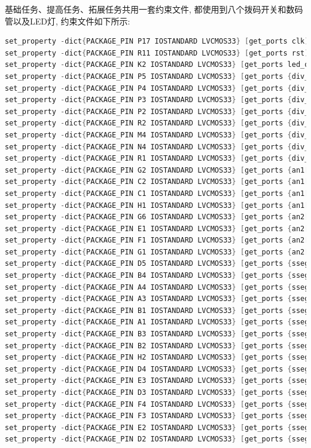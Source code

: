 \documentclass{article}
\begin{document}
基础任务、提高任务、拓展任务共用一套约束文件, 都使用到八个拨码开关和数码管以及LED灯, 约束文件如下所示:
\begin{lstlisting}[language=Verilog, caption={基础任务、提高任务、拓展任务约束文件}]
set_property -dict{PACKAGE_PIN P17 IOSTANDARD LVCMOS33} [get_ports clk]
set_property -dict{PACKAGE_PIN R11 IOSTANDARD LVCMOS33} [get_ports rst]
set_property -dict{PACKAGE_PIN K2 IOSTANDARD LVCMOS33} [get_ports led_out]
set_property -dict{PACKAGE_PIN P5 IOSTANDARD LVCMOS33} [get_ports {div_coe[7]}]
set_property -dict{PACKAGE_PIN P4 IOSTANDARD LVCMOS33} [get_ports {div_coe[6]}]
set_property -dict{PACKAGE_PIN P3 IOSTANDARD LVCMOS33} [get_ports {div_coe[5]}]
set_property -dict{PACKAGE_PIN P2 IOSTANDARD LVCMOS33} [get_ports {div_coe[4]}]
set_property -dict{PACKAGE_PIN R2 IOSTANDARD LVCMOS33} [get_ports {div_coe[3]}]
set_property -dict{PACKAGE_PIN M4 IOSTANDARD LVCMOS33} [get_ports {div_coe[2]}]
set_property -dict{PACKAGE_PIN N4 IOSTANDARD LVCMOS33} [get_ports {div_coe[1]}]
set_property -dict{PACKAGE_PIN R1 IOSTANDARD LVCMOS33} [get_ports {div_coe[0]}]
set_property -dict{PACKAGE_PIN G2 IOSTANDARD LVCMOS33} [get_ports {an1[0]}]
set_property -dict{PACKAGE_PIN C2 IOSTANDARD LVCMOS33} [get_ports {an1[1]}]
set_property -dict{PACKAGE_PIN C1 IOSTANDARD LVCMOS33} [get_ports {an1[2]}]
set_property -dict{PACKAGE_PIN H1 IOSTANDARD LVCMOS33} [get_ports {an1[3]}]
set_property -dict{PACKAGE_PIN G6 IOSTANDARD LVCMOS33} [get_ports {an2[3]}]
set_property -dict{PACKAGE_PIN E1 IOSTANDARD LVCMOS33} [get_ports {an2[2]}]
set_property -dict{PACKAGE_PIN F1 IOSTANDARD LVCMOS33} [get_ports {an2[1]}]
set_property -dict{PACKAGE_PIN G1 IOSTANDARD LVCMOS33} [get_ports {an2[0]}]
set_property -dict{PACKAGE_PIN D5 IOSTANDARD LVCMOS33} [get_ports {sseg1[7]}]
set_property -dict{PACKAGE_PIN B4 IOSTANDARD LVCMOS33} [get_ports {sseg1[6]}]
set_property -dict{PACKAGE_PIN A4 IOSTANDARD LVCMOS33} [get_ports {sseg1[5]}]
set_property -dict{PACKAGE_PIN A3 IOSTANDARD LVCMOS33} [get_ports {sseg1[4]}]
set_property -dict{PACKAGE_PIN B1 IOSTANDARD LVCMOS33} [get_ports {sseg1[3]}]
set_property -dict{PACKAGE_PIN A1 IOSTANDARD LVCMOS33} [get_ports {sseg1[2]}]
set_property -dict{PACKAGE_PIN B3 IOSTANDARD LVCMOS33} [get_ports {sseg1[1]}]
set_property -dict{PACKAGE_PIN B2 IOSTANDARD LVCMOS33} [get_ports {sseg1[0]}]
set_property -dict{PACKAGE_PIN H2 IOSTANDARD LVCMOS33} [get_ports {sseg2[7]}]
set_property -dict{PACKAGE_PIN D4 IOSTANDARD LVCMOS33} [get_ports {sseg2[6]}]
set_property -dict{PACKAGE_PIN E3 IOSTANDARD LVCMOS33} [get_ports {sseg2[5]}]
set_property -dict{PACKAGE_PIN D3 IOSTANDARD LVCMOS33} [get_ports {sseg2[4]}]
set_property -dict{PACKAGE_PIN F4 IOSTANDARD LVCMOS33} [get_ports {sseg2[3]}]
set_property -dict{PACKAGE_PIN F3 IOSTANDARD LVCMOS33} [get_ports {sseg2[2]}]
set_property -dict{PACKAGE_PIN E2 IOSTANDARD LVCMOS33} [get_ports {sseg2[1]}]
set_property -dict{PACKAGE_PIN D2 IOSTANDARD LVCMOS33} [get_ports {sseg2[0]}]
\end{lstlisting}
\end{document}
